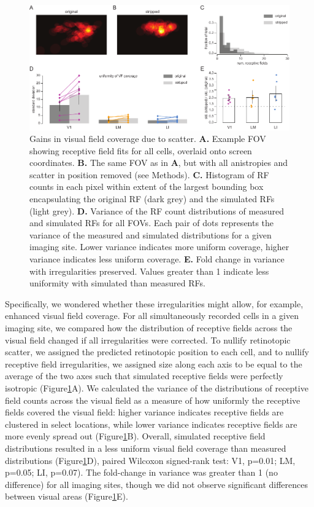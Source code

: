 \begin{figure}[t!]
    \includegraphics[width=\textwidth]{figures/chapter_3/fig_3-5_vf_coverage/fig_3-5_vf_coverage.pdf}
    \vspace{.1in}
    \caption[Compensatory visual field coverage]{Gains in visual field coverage due to scatter. 
    \textbf{A.} Example FOV showing receptive field fits for all cells, overlaid onto screen coordinates.
    \textbf{B.} The same FOV as in \textbf{A}, but with all anistropies and scatter in position removed (see Methods). 
    \textbf{C.} Histogram of RF counts in each pixel within extent of the largest bounding box encapsulating the original RF (dark grey) and the simulated RFs (light grey).
    \textbf{D.} Variance of the RF count distributions of measured and simulated RFs for all FOVs. Each pair of dots represents the variance of the measured and simulated distributions for a given imaging site. Lower variance indicates more uniform coverage, higher variance indicates less uniform coverage.
    \textbf{E.} Fold change in variance with irregularities preserved. Values greater than 1 indicate less uniformity with simulated than measured RFs.
    \label{fig:vf_coverage}}
\end{figure}

Specifically, we wondered whether these irregularities might allow, for example, enhanced visual field coverage. For all simultaneously recorded cells in a given imaging site, we compared how the distribution of receptive fields across the visual field changed if all irregularities were corrected. To nullify retinotopic scatter, we assigned the predicted retinotopic position to each cell, and to nullify receptive field irregularities, we assigned size along each axis to be equal to the average of the two axes such that simulated receptive fields were perfectly isotropic (Figure\ref{fig:vf_coverage}A). We calculated the variance of the distributions of receptive field counts across the visual field as a measure of how uniformly the receptive fields covered the visual field:  higher variance indicates receptive fields are clustered in select locations, while lower variance indicates receptive fields are more evenly spread out (Figure\ref{fig:vf_coverage}B). Overall, simulated receptive field distributions resulted in a less uniform visual field coverage than measured distributions (Figure\ref{fig:vf_coverage}D), paired Wilcoxon signed-rank test: V1, p=0.01; LM, p=0.05; LI, p=0.07). The fold-change in variance was greater than 1 (no difference) for all imaging sites, though we did not observe significant differences between visual areas (Figure\ref{fig:vf_coverage}E). 

